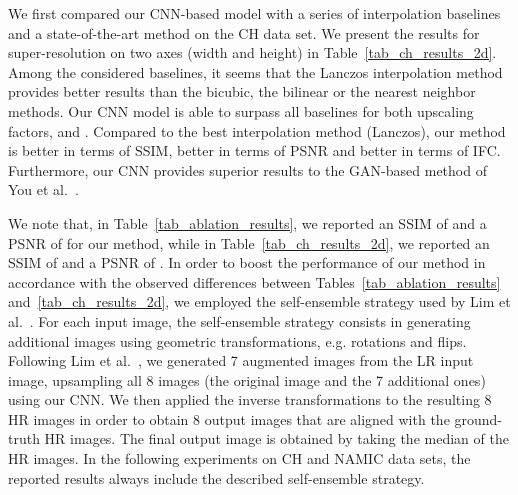 \documentclass{ieeeaccess}
\begin{document}
We first compared our CNN-based model with a series of interpolation baselines and a state-of-the-art method \cite{You-TMI-2019} on the CH data set. We present the results for super-resolution on two axes (width and height) in Table~\ref{tab_ch_results_2d}. Among the considered baselines, it seems that the Lanczos interpolation method provides better results than the bicubic, the bilinear or the nearest neighbor methods. Our CNN model is able to surpass all baselines for both upscaling factors,  and . Compared to the best interpolation method (Lanczos), our method is  better in terms of SSIM,  better in terms of PSNR and  better in terms of IFC. Furthermore, our CNN provides superior results to the GAN-based method of You et al.~\cite{You-TMI-2019}.

We note that, in Table~\ref{tab_ablation_results}, we reported an SSIM of  and a PSNR of  for our method, while in Table~\ref{tab_ch_results_2d}, we reported an SSIM of  and a PSNR of . In order to boost the performance of our method in accordance with the observed differences between Tables~\ref{tab_ablation_results} and~\ref{tab_ch_results_2d}, we employed the self-ensemble strategy used by Lim et al.~\cite{Lim-CVPRW-2017}. For each input image, the self-ensemble strategy consists in generating additional images using geometric transformations, e.g. rotations and flips. Following Lim et al.~\cite{Lim-CVPRW-2017}, we generated 7 augmented images from the LR input image, upsampling all 8 images (the original image and the 7 additional ones) using our CNN. We then applied the inverse transformations to the resulting 8 HR images in order to obtain 8 output images that are aligned with the ground-truth HR images. The final output image is obtained by taking the median of the HR images. In the following experiments on CH and NAMIC data sets, the reported results always include the described self-ensemble strategy.
\end{document}
